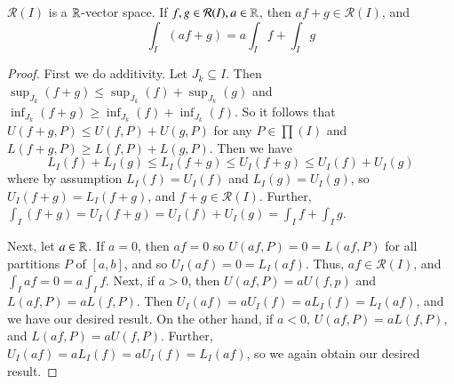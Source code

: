 \begin{prop}\label{prop:4.2.1}
    $\mathcal{R}(I)$ is a $\mathbb R$-vector space. If $f,g \in \mathcal{R}(I), a \in \mathbb R$, then $af+g \in \mathcal{R}(I)$, and $$\int_I(af+g) = a\int_If+\int_Ig$$
\end{prop}
\begin{proof}
    First we do additivity. Let $J_k \subseteq I$. Then $\sup_{J_k}(f+g) \leq \sup_{J_k}(f) + \sup_{J_k}(g)$ and $\inf_{J_k}(f+g) \geq \inf_{J_k}(f) + \inf_{J_k}(f)$. So it follows that $U(f+g,P) \leq U(f,P) + U(g,P)$ for any $P \in \prod(I)$ and $L(f+g,P) \geq L(f,P) + L(g,P)$. Then we have $$L_I(f) + L_I(g) \leq L_I(f+g) \leq U_I(f+g) \leq U_I(f) + U_I(g)$$ where by assumption $L_I(f) = U_I(f)$ and $L_I(g) = U_I(g)$, so $U_I(f+g) = L_I(f+g)$, and $f+g \in \mathcal{R}(I)$. Further, $\int_I(f+g) = U_I(f+g) = U_I(f) + U_I(g) = \int_If + \int_Ig$. 

    Next, let $a \in \mathbb R$. If $a = 0$, then $af = 0$ so $U(af,P) = 0 = L(af,P)$ for all partitions $P$ of $[a,b]$, and so $U_I(af) = 0 = L_I(af)$. Thus, $af \in \mathcal{R}(I)$, and $\int_Iaf = 0 =a\int_If$. Next, if $a > 0$, then $U(af,P) = aU(f,p)$ and $L(af,P) = aL(f,P)$. Then $U_I(af) = aU_I(f) = aL_I(f) = L_I(af)$, and we have our desired result. On the other hand, if $a < 0$, $U(af,P) = aL(f,P)$, and $L(af,P) = aU(f,P)$. Further, $U_I(af) = aL_I(f) = aU_I(f) = L_I(af)$, so we again obtain our desired result.
\end{proof}



